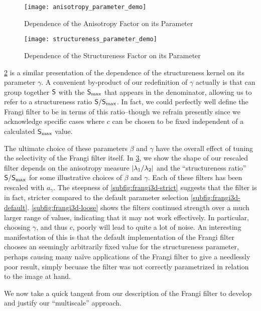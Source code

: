\begin{figure}[t] \centering
  \texttt{[image: anisotropy\_parameter\_demo]}
  \caption{Dependence of the Anisotropy Factor on its Parameter}
  \label{fig:anisotropy-parameter-demo}
\end{figure}

\begin{figure}[t] \centering
  \texttt{[image: structureness\_parameter\_demo]}
  \caption{Dependence of the Structureness Factor on its Parameter}
  \label{fig:structureness-parameter-demo}
\end{figure}

\cref{fig:structureness-parameter-demo} is a similar presentation of the dependence of the structureness kernel on its parameter $\gamma$.
A convenient by-product of our redefinition of $\gamma$ actually is that can group together $\mathsf{S}$ with the $\mathsf{S}_{\max}$ that appears in the denominator, allowing us to refer to a structureness ratio $\mathsf{S}/\mathsf{S}_{\max}$. In fact, we could perfectly well define the Frangi filter to be in terms of this ratio--though we refrain presently since we acknowledge specific cases where $c$ can be chosen to be fixed independent of a calculated $\mathsf{S}_{\max}$ value.


The ultimate choice of these parameters $\beta$ and $\gamma$ have the overall effect of tuning the selectivity of the Frangi filter itself. In \cref{fig:frangi3d-selection}, we show the shape of our rescaled filter depends on the anisotropy measure $\vert\lambda_1 / \lambda_2\vert$ and the ``structureness ratio'' $\mathsf{S}/\mathsf{S}_{\max}$ for some illustrative choices of $\beta$ and $\gamma$. Each of these filters has been rescaled with $a_\gamma$. The steepness of \cref{subfig:frangi3d-strict} suggests that the filter is in fact, stricter compared to the default parameter selection \cref{subfig:frangi3d-default}. \cref{subfig:frangi3d-loose} shows the filters continued strength over a much larger range of values, indicating that it may not work effectively. In particular, choosing $\gamma$, and thus $c$, poorly will lead to quite a lot of noise.
An interesting manifestation of this is that the default implementation of the Frangi filter \cite{scipy} chooses an seemingly arbitrarily fixed value for the structureness parameter, perhaps causing many na\"ive applications of the Frangi filter to give a needlessly poor result, simply becuase the filter was not correctly parametrized in relation to the image at hand.

\begin{figure}[t] \centering
\subfloat[Strict]{\texttt{[image: 4]}} \label{subfig:frangi3d-strict}
\subfloat[Standard]{\texttt{[image: 14]}} \label{subfig:frangi3d-default}
 \label{subfig:frangi3d-loose}
\label{fig:frangi3d-selection}
\end{figure}



	We now take a quick tangent from our description of the Frangi filter to develop and justify our ``multiscale'' approach.
	
